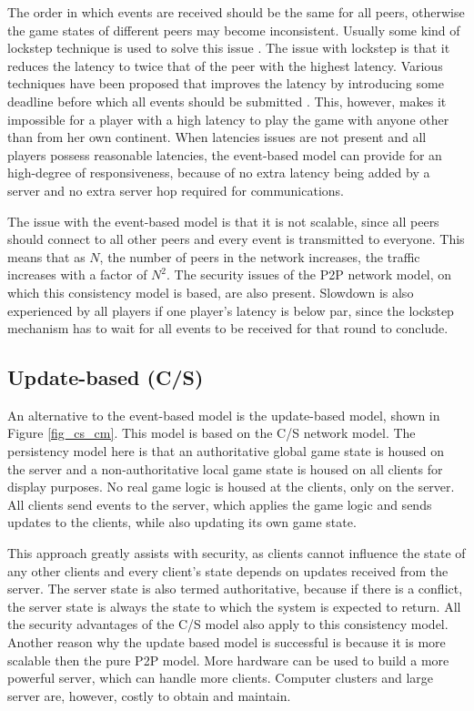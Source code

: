 \documentclass[10pt,a4paper,journal,cspaper,compsoc]{IEEEtran}
\begin{document}
The order in which events are received should be the same for all peers, otherwise the game states of different peers may become inconsistent.
Usually some kind of lockstep technique is used to solve this issue \cite{pessimistic_lock_step}. The issue with lockstep is that it reduces the
latency to twice that of the peer with the highest latency. Various techniques have been proposed that improves the latency by introducing some
deadline before which all events should be submitted \cite{cheat_proof_event_ordering}. This, however, makes it impossible for a player with a high
latency to play the game with anyone other than from her own continent. When latencies issues are not present and all players possess reasonable
latencies, the event-based model can provide for an high-degree of responsiveness, because of no extra latency being added by a server and no extra
server hop required for communications.

The issue with the event-based model is that it is not scalable, since all peers should connect to all other peers and every event is transmitted to
everyone. This means that as $N$, the number of peers in the network increases, the traffic increases with a factor of $N^2$. The security issues of
the P2P network model, on which this consistency model is based, are also present. Slowdown is also experienced by all players if one player's
latency is below par, since the lockstep mechanism has to wait for all events to be received for that round to conclude.

\subsection{Update-based (C/S)}

An alternative to the event-based model is the update-based model, shown in Figure \ref{fig_cs_cm}. This model is based on the C/S network model. The
persistency model here is that an authoritative global game state is housed on the server and a non-authoritative local game state is housed on all
clients for display purposes. No real game logic is housed at the clients, only on the server. All clients send events to the server, which applies
the game logic and sends updates to the clients, while also updating its own game state.

This approach greatly assists with security, as clients cannot influence the state of any other clients and every client's state depends on updates
received from the server. The server state is also termed authoritative, because if there is a conflict, the server state is always the state to
which the system is expected to return. All the security advantages of the C/S model also apply to this consistency model. Another reason why the
update based model is successful is because it is more scalable then the pure P2P model. More hardware can be used to build a more powerful server,
which can handle more clients. Computer clusters and large server are, however, costly to obtain and maintain.
\end{document}
